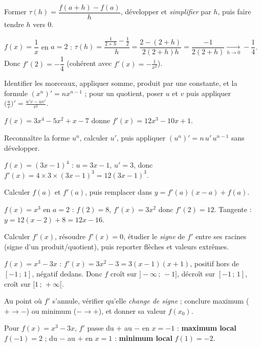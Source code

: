 Former $\tau(h)=\dfrac{f(a+h)-f(a)}{h}$, développer et \emph{simplifier} par $h$,
puis faire tendre $h$ vers $0$.
\begin{exemple}
$f(x)=\dfrac1x$ en $a=2$ : $\tau(h)=\dfrac{\frac1{2+h}-\frac12}{h}
=\dfrac{2-(2+h)}{2(2+h)h}=\dfrac{-1}{2(2+h)}\xrightarrow[h\to0]{}-\dfrac14$. Donc
$f'(2)=-\dfrac14$ (cohérent avec $f'(x)=-\frac1{x^2}$).
\end{exemple}

Identifier les morceaux, appliquer somme, produit par une constante, et la formule
$(x^n)'=n x^{n-1}$ ; pour un quotient, poser $u$ et $v$ puis appliquer
$\big(\frac uv\big)'=\frac{u'v-uv'}{v^2}$.
\begin{exemple}
$f(x)=3x^4-5x^2+x-7$ donne $f'(x)=12x^3-10x+1$.
\end{exemple}

Reconnaître la forme $u^n$, calculer $u'$, puis appliquer $(u^n)'=n\,u'\,u^{n-1}$
sans développer.
\begin{exemple}
$f(x)=(3x-1)^4$ : $u=3x-1$, $u'=3$, donc $f'(x)=4\times 3\times(3x-1)^3=12(3x-1)^3$.
\end{exemple}

Calculer $f(a)$ et $f'(a)$, puis remplacer dans $y=f'(a)(x-a)+f(a)$.
\begin{exemple}
$f(x)=x^3$ en $a=2$ : $f(2)=8$, $f'(x)=3x^2$ donc $f'(2)=12$. Tangente :
$y=12(x-2)+8=12x-16$.
\end{exemple}

Calculer $f'(x)$, résoudre $f'(x)=0$, étudier le \emph{signe} de $f'$ entre ses
racines (signe d'un produit/quotient), puis reporter flèches et valeurs extrêmes.
\begin{exemple}
$f(x)=x^3-3x$ : $f'(x)=3x^2-3=3(x-1)(x+1)$, positif hors de $[-1\,;\,1]$, négatif
dedans. Donc $f$ croît sur $]-\infty\,;\,-1]$, décroît sur $[-1\,;\,1]$, croît sur
$[1\,;\,+\infty[$.
\end{exemple}

Au point où $f'$ s'annule, vérifier qu'elle \emph{change de signe} ; conclure
maximum ($+\to-$) ou minimum ($-\to+$), et donner sa valeur $f(x_0)$.
\begin{exemple}
Pour $f(x)=x^3-3x$, $f'$ passe du $+$ au $-$ en $x=-1$ : \textbf{maximum local}
$f(-1)=2$ ; du $-$ au $+$ en $x=1$ : \textbf{minimum local} $f(1)=-2$.
\end{exemple}
